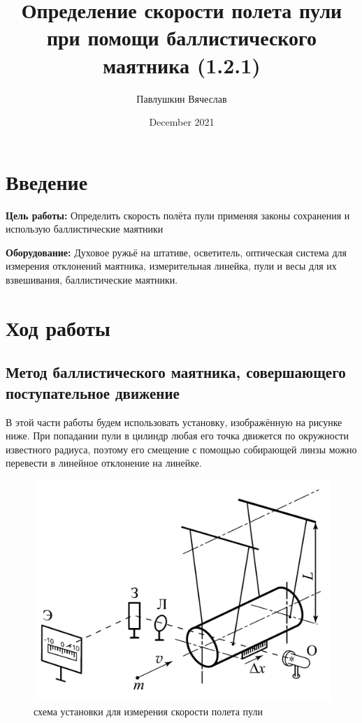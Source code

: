 \documentclass[a4paper,12pt]{article}
\title{\textbf{Определение скорости полета пули при помощи баллистического маятника (1.2.1)}}
\author{Павлушкин Вячеслав}
\date{December 2021}
\begin{document}
	
	\maketitle
	
	\section{Введение}
	
	\textbf{Цель работы:}
	Определить скорость полёта пули применяя законы сохранения и использую баллистические маятники
	
	\noindent\textbf{Оборудование:}
	Духовое ружьё на штативе, осветитель, оптическая система для измерения отклонений маятника, измерительная линейка, пули и весы для их взвешивания, баллистические маятники.
	\section{Ход работы}
	
	\subsection{Метод баллистического маятника, совершающего поступательное движение}
	В этой части работы будем использовать установку, изображённую на рисунке ниже. При попадании пули в цилиндр любая его точка движется по окружности известного радиуса, поэтому его смещение с помощью собирающей линзы можно перевести в линейное отклонение на линейке.
	
	\begin{figure}[H]
		\begin{center}
			\includegraphics[scale = 0.56]{1.2.1 ustan1}
			\caption{схема установки для измерения скорости полета пули}
		\end{center}
	\end{figure}
	
\end{document}
